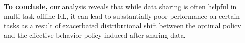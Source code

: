 
\textbf{To conclude,} our analysis reveals that while data sharing is often helpful in multi-task offline RL, it can lead to substantially poor performance on certain tasks as a result of exacerbated distributional shift between the optimal policy and the effective behavior policy induced after sharing data. 


